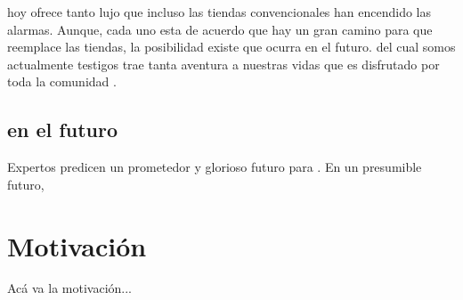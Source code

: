 \ecommerce hoy ofrece tanto lujo que incluso las tiendas convencionales han encendido las alarmas. Aunque, cada uno esta de acuerdo que hay un gran camino para que \ecommerce reemplace las tiendas, la posibilidad existe que ocurra en el futuro. \ecommerce del cual somos actualmente testigos trae tanta aventura a nuestras vidas que es disfrutado por toda la comunidad \online.


\subsection{\ecommerce en el futuro}


Expertos predicen un prometedor y glorioso futuro para \ecommerce. En un presumible futuro, \ecommerce 


\section{Motivación}\label{cap:intro:motivacion}

Acá va la motivación...

